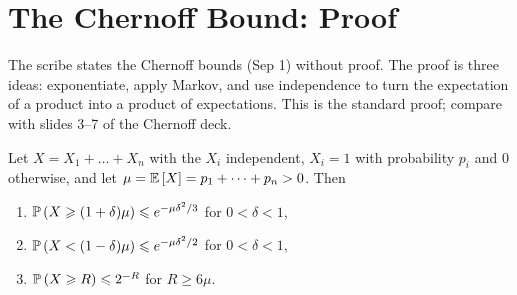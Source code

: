 \section{The Chernoff Bound: Proof}\label{sec:chernoff}

The scribe states the Chernoff bounds (Sep 1) without proof. The proof is three ideas:
exponentiate, apply Markov, and use independence to turn the expectation of a product into a
product of expectations. This is the standard proof; compare with slides 3--7 of the Chernoff deck.

\begin{theorem}\label{thm:chernoff-pp}
    Let $X = X_1 + \dots + X_n$ with the $X_i$ independent, $X_i = 1$ with probability $p_i$ and $0$
    otherwise, and let $\mu = \operatorname{\mathbb{E}}\left[X\right] = p_1 + \dots + p_n > 0$. Then
    \begin{enumerate}
        \item $\operatorname{\mathbb{P}}\left(X \geqslant (1+\delta)\mu\right) \leqslant e^{-\mu\delta^2/3}$ for $0 < \delta < 1$,
        \item $\operatorname{\mathbb{P}}\left(X < (1-\delta)\mu\right) \leqslant e^{-\mu\delta^2/2}$ for $0 < \delta < 1$,
        \item $\operatorname{\mathbb{P}}\left(X \geqslant R\right) \leqslant 2^{-R}$ for $R \geq 6\mu$.
    \end{enumerate}
\end{theorem}

